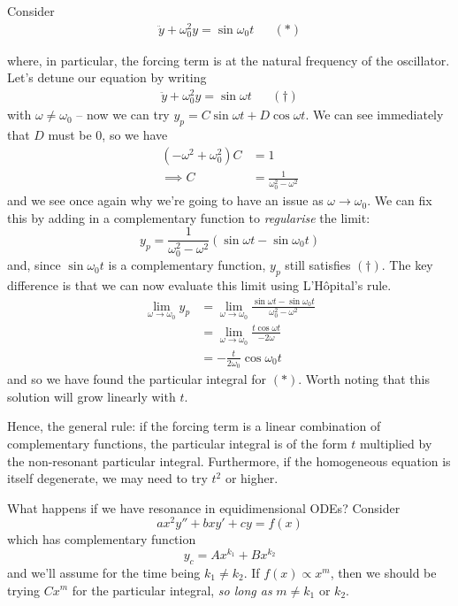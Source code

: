 \documentclass{../../template/note}
\begin{document}
    \begin{example}
        Consider
        \begin{align*}
            \ddot y + \omega_0^2 y = \sin \omega_0 t && (*)
        \end{align*}
        
        where, in particular, the forcing term is at the natural frequency of the oscillator. Let's detune our equation by writing
        \begin{align*}
            \ddot y + \omega_0^2 y = \sin \omega t && (\dagger)
        \end{align*}
        with \(\omega \neq \omega_0\) -- now we can try \(y_p = C \sin \omega t + D \cos \omega t\). We can see immediately that \(D\) must be 0, so we have
        \begin{align*}
            (-\omega^2 + \omega_0^2)C &= 1 \\
            \implies C &= \frac{1}{\omega_0^2 - \omega^2}
        \end{align*}
        and we see once again why we're going to have an issue as \(\omega \to \omega_0\). We can fix this by adding in a complementary function to \emph{regularise} the limit:
        \[
            y_p = \frac{1}{\omega_0^2 - \omega^2}(\sin \omega t - \sin \omega_0 t)
        \]
        and, since \(\sin \omega_0 t\) is a complementary function, \(y_p\) still satisfies \((\dagger)\). The key difference is that we can now evaluate this limit using L'H\^opital's rule.
        \begin{align*}
            \lim_{\omega \to \omega_0} y_p &= \lim_{\omega \to \omega_0} \frac{\sin \omega t - \sin \omega_0 t}{\omega_0^2 - \omega^2} \\
            &= \lim_{\omega \to \omega_0} \frac{t \cos \omega t}{-2 \omega} \\
            &= -\frac{t}{2 \omega_0} \cos \omega_0 t
        \end{align*}
        and so we have found the particular integral for \((*)\). Worth noting that this solution will grow linearly with \(t\).
    \end{example}
    
    Hence, the general rule: if the forcing term is a linear combination of complementary functions, the particular integral is of the form \(t\) multiplied by the non-resonant particular integral. Furthermore, if the homogeneous equation is itself degenerate, we may need to try \(t^2\) or higher.

    What happens if we have resonance in equidimensional ODEs? Consider
    \[
        ax^2 y'' + bx y' + cy = f(x)
    \]
    which has complementary function
    \[
        y_c = Ax^{k_1} + Bx^{k_2}
    \]
    and we'll assume for the time being \(k_1 \neq k_2\). If \(f(x) \propto x^m\), then we should be trying \(Cx^m\) for the particular integral, \emph{so long as} \(m \neq k_1\) or \(k_2\).
\end{document}
